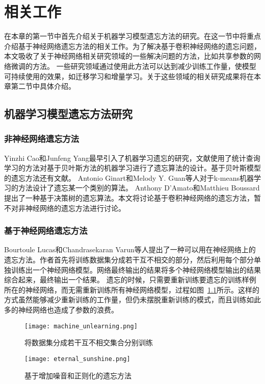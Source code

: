 
\chapter{相关工作}

在本章的第一节中首先介绍关于机器学习模型遗忘方法的研究。在这一节中将重点介绍基于神经网络遗忘方法的相关工作。为了解决基于卷积神经网络的遗忘问题，本文吸收了关于神经网络相关研究领域的一些解决问题的方法，比如共享参数的网络微调的方法。
一些研究领域通过使用此方法可以达到减少训练工作量，使模型可持续使用的效果，如迁移学习和增量学习。关于这些领域的相关研究成果将在本章第二节中具体介绍。

\section{机器学习模型遗忘方法研究}
\subsection{非神经网络遗忘方法}
Yinzhi Cao和Junfeng Yang\cite{yinzhicao2015}最早引入了机器学习遗忘的研究，文献使用了统计查询学习\cite{10.1145/293347.293351}的方法对基于贝叶斯方法的机器学习进行了遗忘算法的设计。基于贝叶斯模型的遗忘方法还有文献\cite{10.1145/3196494.3196517}。
Antonio Ginart和Melody Y. Guan等人\cite{antonio2019}对于k-means机器学习的方法设计了遗忘某一个类别的算法。
Anthony D’Amato和Matthieu Boussard\cite{10.1007/978-3-319-40159-1_19}提出了一种基于决策树的遗忘算法。本文将讨论基于卷积神经网络的遗忘方法，暂不对非神经网络的遗忘方法进行讨论。

\subsection{基于神经网络遗忘方法}
Bourtoule Lucas和Chandrasekaran Varun等人\cite{2019arXiv191203817B}提出了一种可以用在神经网络上的遗忘方法。作者首先将训练数据集分成若干互不相交的部分，然后利用每个部分单独训练出一个神经网络模型。网络最终输出的结果将多个神经网络模型输出的结果综合起来，最终输出一个结果。
遗忘的时候，只需要重新训练要遗忘的训练样例所在的神经网络，而无需重新训练所有神经网络模型，过程如图~\ref{fig:machine_unlearning}所示。这样的方式虽然能够减少重新训练的工作量，但仍未摆脱重新训练的模式，而且训练如此多的神经网络也造成了参数的浪费。
\begin{figure}
    \centering
    \texttt{[image: machine\_unlearning.png]}
    \caption{将数据集分成若干互不相交集合分别训练\cite{2019arXiv191203817B}}
    \label{fig:machine_unlearning}
\end{figure}
\begin{figure}
    \centering
    \texttt{[image: eternal\_sunshine.png]}
    \caption{基于增加噪音和正则化的遗忘方法\cite{2019arXiv191203817B}}
    \label{fig:eternal_sunshine}
\end{figure}

